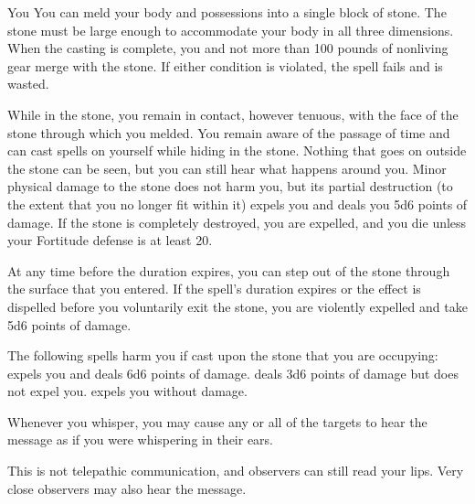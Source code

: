 \begin{spellheader}
    \spelldur{\durlong}
\end{spellheader}
\begin{spelleffects}
    \begin{spelltarget}{You}
        \spelleffect You can meld your body and possessions into a single block of stone. The stone must be large enough to accommodate your body in all three dimensions. When the casting is complete, you and not more than 100 pounds of nonliving gear merge with the stone. If either condition is violated, the spell fails and is wasted.
        \par While in the stone, you remain in contact, however tenuous, with the face of the stone through which you melded. You remain aware of the passage of time and can cast spells on yourself while hiding in the stone. Nothing that goes on outside the stone can be seen, but you can still hear what happens around you. Minor physical damage to the stone does not harm you, but its partial destruction (to the extent that you no longer fit within it) expels you and deals you 5d6 points of damage. If the stone is completely destroyed, you are expelled, and you die unless your Fortitude defense is at least 20.
        \par At any time before the duration expires, you can step out of the stone through the surface that you entered. If the spell's duration expires or the effect is dispelled before you voluntarily exit the stone, you are violently expelled and take 5d6 points of damage.
    \end{spelltarget}
\end{spelleffects}
\begin{spellfooter}
    \spellnotes The following spells harm you if cast upon the stone that you are occupying:  expels you and deals 6d6 points of damage.  deals 3d6 points of damage but does not expel you.  expels you without damage.
\end{spellfooter}

\begin{spellheader}
    \spellrng{\rngmed}
    \spelldur{\durlong}
\end{spellheader}
\begin{spelleffects}
    \spellline
    \spelleffect Whenever you whisper, you may cause any or all of the targets to hear the message as if you were whispering in their ears.
\end{spelleffects}
\begin{spellfooter}
    \spellnotes This is not telepathic communication, and observers can still read your lips. Very close observers may also hear the message.
\end{spellfooter}

